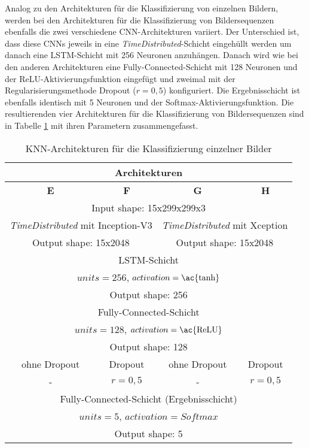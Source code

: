 Analog zu den Architekturen für die Klassifizierung von einzelnen Bildern, werden bei den Architekturen für die Klassifizierung von Bildersequenzen ebenfalls die zwei verschiedene \ac{CNN}-Architekturen variiert. Der Unterschied ist, dass diese \acp{CNN} jeweils in eine \textit{TimeDistributed}-Schicht eingehüllt werden um danach eine \ac{LSTM}-Schicht mit 256 Neuronen anzuhängen. Danach wird wie bei den anderen Architekturen eine Fully-Connected-Schicht mit 128 Neuronen und der \ac{ReLU}-Aktivierungsfunktion eingefügt und zweimal mit der Regularisierungsmethode Dropout ($r=0,5$) konfiguriert. Die Ergebnisschicht ist ebenfalls identisch mit 5 Neuronen und der Softmax-Aktivierungsfunktion. Die resultierenden vier Architekturen für die Klassifizierung von Bildersequenzen sind in Tabelle \ref{tab_architekturen_video} mit ihren Parametern zusammengefasst.

\begin{table}[h]
\centering
\def\arraystretch{1.4}
\begin{tabular}{|c|c|c|c|}
\hline
\multicolumn{4}{|c|}{\textbf{Architekturen}} \\
\hline
\textbf{E} & \textbf{F} & \textbf{G} & \textbf{H} \\
\hline
\hline
\multicolumn{4}{|c|}{Input shape: 15x299x299x3} \\
\hline
\multicolumn{2}{|c|}{\textit{TimeDistributed} mit Inception-V3} & \multicolumn{2}{|c|}{\textit{TimeDistributed} mit Xception} \\
\multicolumn{2}{|c|}{Output shape: 15x2048} & \multicolumn{2}{|c|}{Output shape: 15x2048} \\
\hline
\multicolumn{4}{|c|}{\ac{LSTM}-Schicht} \\
\multicolumn{4}{|c|}{$units=256$, $activation=\text{\ac{tanh}}$} \\
\multicolumn{4}{|c|}{Output shape: 256} \\
\hline
\multicolumn{4}{|c|}{Fully-Connected-Schicht} \\
\multicolumn{4}{|c|}{$units=128$, $activation=\text{\ac{ReLU}}$} \\
\multicolumn{4}{|c|}{Output shape: 128} \\
\hline
ohne Dropout & Dropout & ohne Dropout & Dropout \\
- & $r=0,5$ & - & $r=0,5$ \\
\hline
\multicolumn{4}{|c|}{Fully-Connected-Schicht (Ergebnisschicht)} \\
\multicolumn{4}{|c|}{$units=5$, $activation=Softmax$} \\
\multicolumn{4}{|c|}{Output shape: 5} \\
\hline
\end{tabular}
\caption{\ac{KNN}-Architekturen für die Klassifizierung einzelner Bilder}
\label{tab_architekturen_video}
\end{table}













 


 
 

